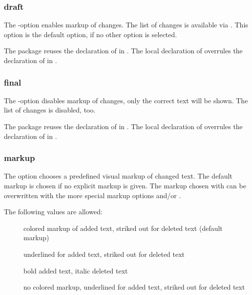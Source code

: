 \subsubsection{draft}

The -option enables markup of changes.
The list of changes is available via .
This option is the default option, if no other option is selected.

The  package reuses the declaration of  in .
The local declaration of  overrules the declaration of  in .



\subsubsection{final}
The -option disables markup of changes, only the correct text will be shown.
The list of changes is disabled, too.

The  package reuses the declaration of  in .
The local declaration of  overrules the declaration of  in .




\subsubsection{markup}

The  option chooses a predefined visual markup of changed text.
The default markup is chosen if no explicit markup is given.
The markup chosen with  can be overwritten with the more special markup options  and/or .

The following values are allowed:
\begin{description}
	\item [] colored markup of added text, striked out for deleted text (default markup)
	\item [] underlined for added text, striked out for deleted text
	\item [] bold added text, italic deleted text
	\item [] no colored markup, underlined for added text, striked out for deleted text
\end{description}

